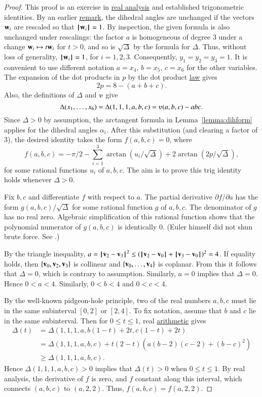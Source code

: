 \begin{proof}
This proof is an exercise in \hyperref[back:analysis]{real analysis} and established
trigonometric identities.
By an earlier \hyperref[rem:dih]{remark}, the dihedral angles are unchanged 
if the vectors ${\mathbf w}_i$ are rescaled so that
${{\hskip0.1em|\hskip-0.15em|\hskip0.1em}{\mathbf w}_i{\hskip0.1em|\hskip-0.15em|\hskip0.1em}}=1$.  By inspection, the given formula is also unchanged under rescalings:
the factor $a$ is homogeneous of degree $3$ under a change ${\mathbf w}_i
\mapsto t {\mathbf w}_i$ for $t>0$, and so is $\sqrt{\Delta}$ by the
formula for $\Delta$.  Thus, without loss of generality, ${{\hskip0.1em|\hskip-0.15em|\hskip0.1em}{\mathbf w}_i{\hskip0.1em|\hskip-0.15em|\hskip0.1em}}=1$, for
$i=1,2,3$.  Consequently, $y_1=y_2=y_3=1$.  It is convenient to use
different notation $a=x_4$, $b=x_5$, $c=x_6$ for the other
variables. The expansion of the dot products in $p$ by the dot product 
\hyperref[eqn:dot-law]{law}
gives
    $$2 p = 8 - (a+b+c).$$
Also, the definitions of $\Delta$ and $\ups$ give
$$\Delta(x_1,\ldots,x_6) = \Delta(1,1,1,a,b,c) =
    \ups(a,b,c) - a b c.$$
Since $\Delta>0$ by assumption, the arctangent formula
in Lemma~\ref{lemma:dihform} 
applies for the dihedral angles $\alpha_i$.  After
this substitution (and clearing a factor of $3$),  %
the desired identity takes the form $f(a,b,c)=0$, where
    $$
    f(a,b,c)= -\pi/2 - \sum_{i=1}^3\arctan(u_i/\sqrt{\Delta}) +
    2\arctan(2 p/\sqrt{\Delta}),
    $$
for some rational functions $u_i$ of $a,b,c$.   The aim is to prove this trig identity holds whenever $\Delta>0$.

Fix $b,c$ and differentiate $f$ with respect
to $a$.  The partial derivative $\partial f/\partial a$ has the form
$g(a,b,c)/\sqrt{\Delta}$ for some rational function $g$ of $a,b,c$.  The denominator of $g$ has no real zero.  Algebraic simplification of this rational function shows that the polynomial numerator of $g(a,b,c)$ is identically $0$.  (Euler himself did not shun brute force.  See
\cite{Euler}.)

By the triangle inequality, $a ={\hskip0.1em|\hskip-0.15em|\hskip0.1em}{\mathbf v}_2 - {\mathbf v}_3{\hskip0.1em|\hskip-0.15em|\hskip0.1em}^2 \le ({\hskip0.1em|\hskip-0.15em|\hskip0.1em}{\mathbf v}_2 - {\mathbf v}_0{\hskip0.1em|\hskip-0.15em|\hskip0.1em}+{\hskip0.1em|\hskip-0.15em|\hskip0.1em}{\mathbf v}_3 - {\mathbf v}_0{\hskip0.1em|\hskip-0.15em|\hskip0.1em})^2 = 4$.  If equality holds, then $\{{\mathbf v}_0,{\mathbf v}_2,{\mathbf v}_3\}$ is collinear and
$\{{\mathbf v}_0,\ldots,{\mathbf v}_4\}$ is coplanar.  From this it follows that $\Delta=0$, which is contrary
to assumption.  Similarly, $a=0$ implies that $\Delta=0$.  Hence $0<a<4$.  Similarly,
$0<b<4$ and $0<c<4$.

By the well-known pidgeon-hole principle, 
two of the real numbers $a,b,c$ must lie in the same subinterval $[0,2]$ or $[2,4]$.
To fix notation, assume that $b$ and $c$ lie in the same subinterval.
Then for $0\le t \le 1$, {real} \hyperref[back:analysis]{arithmetic} gives
$$
\begin{array}{lll}
\Delta(t)&=\Delta(1,1,1,a, b(1-t)+2t,c(1-t)+2t) \\
     &= \Delta(1,1,1,a,b,c) + 
t (2-t) (a (b-2)(c-2) + (b-c)^2)\\
   & \ge \Delta(1,1,1,a,b,c).
\end{array}
$$
Hence $\Delta(1,1,1,a,b,c)>0$ implies that $\Delta(t)>0$ when $0\le t\le 1$.
By real analysis, the derivative of $f$ is  zero, and $f$  constant along this interval,
which connects $(a,b,c)$ to $(a,2,2)$.
Thus, $f(a,b,c) = f(a,2,2)$.  


\end{proof}
